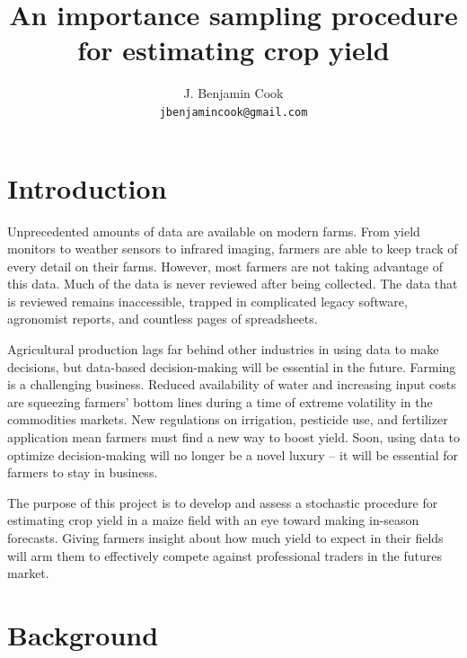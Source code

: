 \documentclass{article} %
\title{An importance sampling procedure\\ for estimating crop yield}
\author{
J. Benjamin Cook\\
\texttt{jbenjamincook@gmail.com}
}
\begin{document}
\maketitle


\section{Introduction}

Unprecedented amounts of data are available on modern farms. From yield monitors to weather sensors to infrared imaging, farmers are able to keep track of every detail on their farms. However, most farmers are not taking advantage of this data. Much of the data is never reviewed after being collected. The data that is reviewed remains inaccessible, trapped in complicated legacy software, agronomist reports, and countless pages of spreadsheets.

Agricultural production lags far behind other industries in using data to make decisions, but data-based decision-making will be essential in the future. Farming is a challenging business. Reduced availability of water and increasing input costs are squeezing farmers’ bottom lines during a time of extreme volatility in the commodities markets. New regulations on irrigation, pesticide use, and fertilizer application mean farmers must find a new way to boost yield. Soon, using data to optimize decision-making will no longer be a novel luxury – it will be essential for farmers to stay in business.

The purpose of this project is to develop and assess a stochastic procedure for estimating crop yield in a maize field with an eye toward making in-season forecasts. Giving farmers insight about how much yield to expect in their fields will arm them to effectively compete against professional traders in the futures market.

\section{Background}
\end{document}
